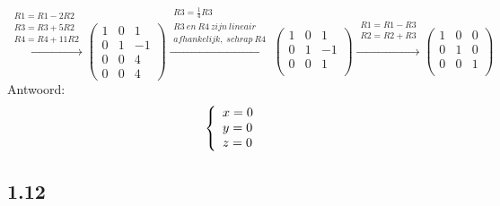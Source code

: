 \documentclass[11pt]{article}
\begin{document}
\[
\overset{\begin{matrix}
 R1 = R1-2R2\\
 R3 = R3+5R2\\
 R4 = R4+11R2
 \end{matrix}}{\rightarrow}
 \begin{pmatrix}
  1 & 0 & 1 \\
  0 & 1 & -1 \\
  0 & 0 & 4 \\
  0 & 0 & 4 
 \end{pmatrix}
 \overset{\begin{matrix}
 R3 = \frac{1}{4}R3\\
 R3\:en\:R4\:zijn\:lineair\\afhankelijk,\;schrap\:R4
 \end{matrix}}{\rightarrow}
 \begin{pmatrix}
  1 & 0 & 1 \\
  0 & 1 & -1 \\
  0 & 0 & 1 \\
 \end{pmatrix}
 \overset{\begin{matrix}
 R1 = R1-R3\\
 R2 = R2+R3\\
 \end{matrix}}{\rightarrow}
 \begin{pmatrix}
  1 & 0 & 0 \\
  0 & 1 & 0 \\
  0 & 0 & 1 \\
 \end{pmatrix}
\]
Antwoord:\\
\[
\left\lbrace
\begin{array}{l l}
x=0\\
y=0\\
z=0
\end{array}
\right.
\]

\subsection*{1.12}
\end{document}
